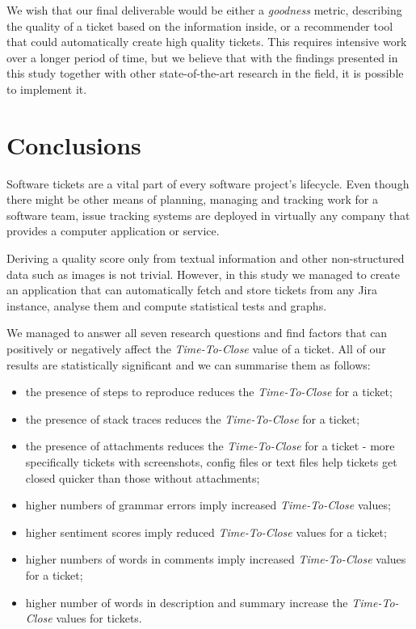\documentclass{mpaper}
\begin{document}
We wish that our final deliverable would be either a \emph{goodness} metric, describing the quality of a ticket based 
on the information inside, or a recommender tool that could automatically create high quality tickets. This requires 
intensive work over a longer period of time, but we believe that with the findings presented in this study together 
with other state-of-the-art research in the field, it is possible to implement it.

\section{Conclusions}\label{conclusions}

Software tickets are a vital part of every software project's lifecycle. Even though there might be other means
of planning, managing and tracking work for a software team, issue tracking systems are deployed in virtually any company
that provides a computer application or service.

Deriving a quality score only from textual information and other non-structured data such as images is not trivial. 
However, in this study we managed to create an application that can automatically fetch and store tickets from any 
Jira instance, analyse them and compute statistical tests and graphs.

We managed to answer all seven research questions and find factors that can positively or 
negatively affect the \emph{Time-To-Close} value of a ticket. All of our results are statistically significant and we can summarise 
them as follows:
\begin{itemize}
  \item the presence of steps to reproduce reduces the \emph{Time-To-Close} for a ticket;
  \item the presence of stack traces reduces the \emph{Time-To-Close} for a ticket;
  \item the presence of attachments reduces the \emph{Time-To-Close} for a ticket - more specifically tickets with screenshots, 
  config files or text files help tickets get closed quicker than those without attachments;
  \item higher numbers of grammar errors imply increased \emph{Time-To-Close} values;
  \item higher sentiment scores imply reduced \emph{Time-To-Close} values for a ticket;
  \item higher numbers of words in comments imply increased \emph{Time-To-Close} values for a ticket;
  \item higher number of words in description and summary increase the \emph{Time-To-Close} values for tickets.
\end{itemize}
\end{document}
